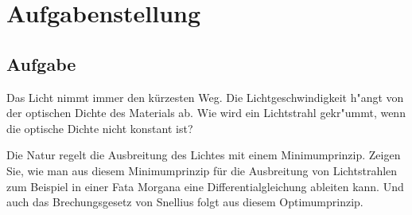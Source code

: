 \section{Aufgabenstellung}

\subsection{Aufgabe}
Das Licht nimmt immer den kürzesten Weg. Die Lichtgeschwindigkeit
h"angt von der optischen Dichte des Materials ab. Wie wird ein Lichtstrahl gekr"ummt, wenn die optische Dichte nicht konstant ist?

Die Natur regelt die Ausbreitung des Lichtes mit einem Minimumprinzip. Zeigen Sie, wie man aus diesem Minimumprinzip für die Ausbreitung von Lichtstrahlen zum Beispiel in einer Fata Morgana eine Differentialgleichung ableiten kann. Und auch das Brechungsgesetz von Snellius folgt aus diesem Optimumprinzip.
